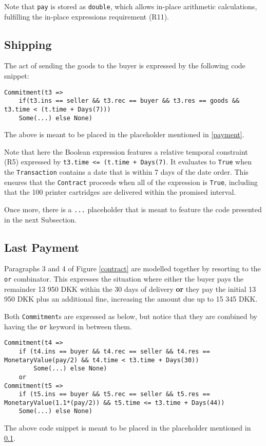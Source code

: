 \documentclass{ituthesis}
\begin{document}
Note that \texttt{pay} is stored as \texttt{double}, which allows in-place arithmetic calculations, fulfilling the in-place expressions requirement (R11).

\subsection{Shipping} \label{shipping}

The act of sending the goods to the buyer is expressed by the following code snippet:
\begin{lstlisting}
Commitment(t3 =>
    if(t3.ins == seller && t3.rec == buyer && t3.res == goods && t3.time < (t.time + Days(7)))
	Some(...) else None)
\end{lstlisting}
The above is meant to be placed in the placeholder mentioned in \ref{payment}.

Note that here the Boolean expression features a relative temporal constraint (R5) expressed by \texttt{t3.time <= (t.time + Days(7)}. It evaluates to \texttt{True} when the \texttt{Transaction} contains a date that is within 7 days of the date order. This ensures that the \texttt{Contract} proceeds when all of the expression is \texttt{True}, including that the 100 printer cartridges are delivered within the promised interval.

Once more, there is a \texttt{...} placeholder that is meant to feature the code presented in the next Subsection.

\subsection{Last Payment} \label{lastPayment}

Paragraphs 3 and 4 of Figure \ref{contract} are modelled together by resorting to the \texttt{or} combinator. This expresses the situation where either the buyer pays the remainder 13 950 DKK within the 30 days of delivery \textbf{or} they pay the initial 13 950 DKK plus an additional fine, increasing the amount due up to 15 345 DKK.

Both \texttt{Commitment}s are expressed as below, but notice that they are combined by having the \texttt{or} keyword in between them.
\begin{lstlisting}
Commitment(t4 =>
    if (t4.ins == buyer && t4.rec == seller && t4.res == MonetaryValue(pay/2) && t4.time < t3.time + Days(30))
		Some(...) else None)
    or
Commitment(t5 => 
    if (t5.ins == buyer && t5.rec == seller && t5.res == MonetaryValue(1.1*(pay/2)) && t5.time <= t3.time + Days(44))
    Some(...) else None)
\end{lstlisting}
The above code snippet is meant to be placed in the placeholder mentioned in \ref{shipping}.
\end{document}
